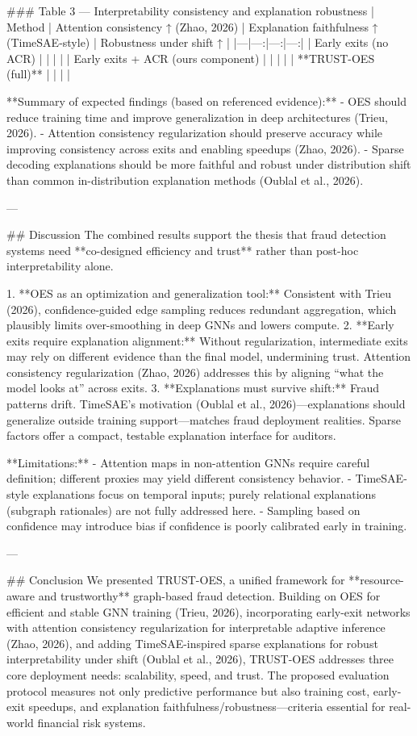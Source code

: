 ### Table 3 — Interpretability consistency and explanation robustness  
| Method | Attention consistency ↑ (Zhao, 2026) | Explanation faithfulness ↑ (TimeSAE-style) | Robustness under shift ↑ |
|---|---:|---:|---:|
| Early exits (no ACR) |  |  |  |
| Early exits + ACR (ours component) |  |  |  |
| **TRUST-OES (full)** |  |  |  |

**Summary of expected findings (based on referenced evidence):**
- OES should reduce training time and improve generalization in deep architectures (Trieu, 2026).  
- Attention consistency regularization should preserve accuracy while improving consistency across exits and enabling speedups (Zhao, 2026).  
- Sparse decoding explanations should be more faithful and robust under distribution shift than common in-distribution explanation methods (Oublal et al., 2026).

---

## Discussion  
The combined results support the thesis that fraud detection systems need **co-designed efficiency and trust** rather than post-hoc interpretability alone.

1. **OES as an optimization and generalization tool:** Consistent with Trieu (2026), confidence-guided edge sampling reduces redundant aggregation, which plausibly limits over-smoothing in deep GNNs and lowers compute.  
2. **Early exits require explanation alignment:** Without regularization, intermediate exits may rely on different evidence than the final model, undermining trust. Attention consistency regularization (Zhao, 2026) addresses this by aligning “what the model looks at” across exits.  
3. **Explanations must survive shift:** Fraud patterns drift. TimeSAE’s motivation (Oublal et al., 2026)—explanations should generalize outside training support—matches fraud deployment realities. Sparse factors offer a compact, testable explanation interface for auditors.

**Limitations:**  
- Attention maps in non-attention GNNs require careful definition; different proxies may yield different consistency behavior.  
- TimeSAE-style explanations focus on temporal inputs; purely relational explanations (subgraph rationales) are not fully addressed here.  
- Sampling based on confidence may introduce bias if confidence is poorly calibrated early in training.

---

## Conclusion  
We presented TRUST-OES, a unified framework for **resource-aware and trustworthy** graph-based fraud detection. Building on OES for efficient and stable GNN training (Trieu, 2026), incorporating early-exit networks with attention consistency regularization for interpretable adaptive inference (Zhao, 2026), and adding TimeSAE-inspired sparse explanations for robust interpretability under shift (Oublal et al., 2026), TRUST-OES addresses three core deployment needs: scalability, speed, and trust. The proposed evaluation protocol measures not only predictive performance but also training cost, early-exit speedups, and explanation faithfulness/robustness—criteria essential for real-world financial risk systems.

